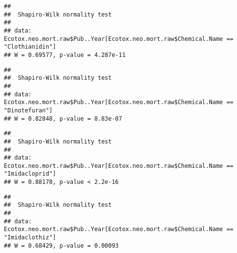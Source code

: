 \documentclass[]{article}
\newenvironment{Shaded}{\begin{snugshade}}{\end{snugshade}}
\newcommand{\KeywordTok}[1]{\textcolor[rgb]{0.13,0.29,0.53}{\textbf{#1}}}
\newcommand{\StringTok}[1]{\textcolor[rgb]{0.31,0.60,0.02}{#1}}
\newcommand{\OperatorTok}[1]{\textcolor[rgb]{0.81,0.36,0.00}{\textbf{#1}}}
\newcommand{\NormalTok}[1]{#1}
\begin{document}
\begin{verbatim}
## 
##  Shapiro-Wilk normality test
## 
## data:  Ecotox.neo.mort.raw$Pub..Year[Ecotox.neo.mort.raw$Chemical.Name ==     "Clothianidin"]
## W = 0.69577, p-value = 4.287e-11
\end{verbatim}

\begin{Shaded}
\end{Shaded}

\begin{verbatim}
## 
##  Shapiro-Wilk normality test
## 
## data:  Ecotox.neo.mort.raw$Pub..Year[Ecotox.neo.mort.raw$Chemical.Name ==     "Dinotefuran"]
## W = 0.82848, p-value = 8.83e-07
\end{verbatim}

\begin{Shaded}
\end{Shaded}

\begin{verbatim}
## 
##  Shapiro-Wilk normality test
## 
## data:  Ecotox.neo.mort.raw$Pub..Year[Ecotox.neo.mort.raw$Chemical.Name ==     "Imidacloprid"]
## W = 0.88178, p-value < 2.2e-16
\end{verbatim}

\begin{Shaded}
\end{Shaded}

\begin{verbatim}
## 
##  Shapiro-Wilk normality test
## 
## data:  Ecotox.neo.mort.raw$Pub..Year[Ecotox.neo.mort.raw$Chemical.Name ==     "Imidaclothiz"]
## W = 0.68429, p-value = 0.00093
\end{verbatim}
\end{document}
